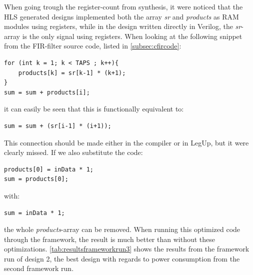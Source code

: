 When going trough the register-count from synthesis, it were noticed that the HLS generated designs implemented both the array \textit{sr} and \textit{products} as RAM modules using registers, while in the design written directly in Verilog, the \textit{sr}-array is the only signal using registers. When looking at the following snippet from the FIR-filter source code, listed in \cref{subsec:cfircode}:
\lstset{language=C,style=CStyle}
\begin{lstlisting}
for (int k = 1; k < TAPS ; k++){
    products[k] = sr[k-1] * (k+1);
}
sum = sum + products[i];
\end{lstlisting}
it can easily be seen that this is functionally equivalent to:
\begin{lstlisting}
sum = sum + (sr[i-1] * (i+1));
\end{lstlisting}
This connection should be made either in the compiler or in LegUp, but it were clearly missed. If we also substitute the code:
\begin{lstlisting}
products[0] = inData * 1;
sum = products[0];
\end{lstlisting}
with:
\begin{lstlisting}
sum = inData * 1;
\end{lstlisting}
the whole \textit{products}-array can be removed. When running this optimized code through the framework, the result is much better than without these optimizations. \cref{tab:resultsframeworkrun3} shows the results from the framework run of design 2, the best design with regards to power consumption from the second framework run.

